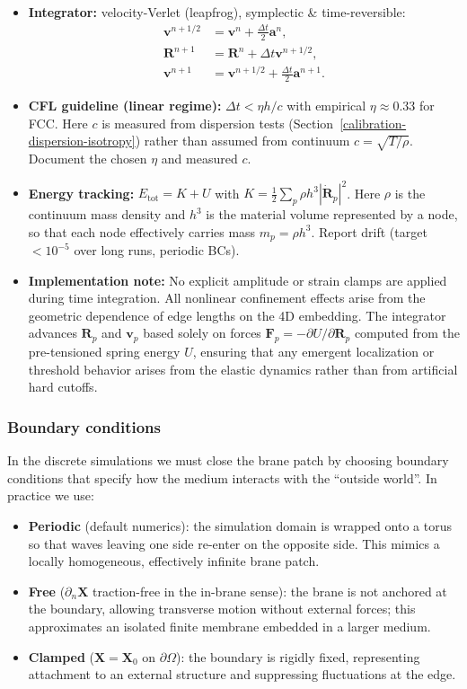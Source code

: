 \begin{itemize}
\item \textbf{Integrator:} velocity-Verlet (leapfrog), symplectic \& time-reversible:
  \begin{align*}
  \mathbf v^{n+1/2}&=\mathbf v^n+\tfrac{\Delta t}{2}\mathbf a^n,\\
  \mathbf R^{n+1}&=\mathbf R^n+\Delta t\mathbf v^{n+1/2},\\
  \mathbf v^{n+1}&=\mathbf v^{n+1/2}+\tfrac{\Delta t}{2}\mathbf a^{n+1}.
  \end{align*}
\item \textbf{CFL guideline (linear regime):} $\Delta t<\eta h/c$ with empirical $\eta\approx0.33$ for FCC. Here $c$ is measured from dispersion tests (Section~\ref{calibration-dispersion-isotropy}) rather than assumed from continuum $c=\sqrt{T/\rho}$. Document the chosen $\eta$ and measured $c$.
\item \textbf{Energy tracking:} $E_\text{tot}=K+U$ with $K=\tfrac12\sum_p \rho h^3|\dot{\mathbf R}_p|^2$.
  Here $\rho$ is the continuum mass density and $h^3$ is the material volume represented by a node,
  so that each node effectively carries mass $m_p=\rho h^3$.
  Report drift (target $<10^{-5}$ over long runs, periodic BCs).
\item \textbf{Implementation note:} No explicit amplitude or strain clamps are applied during time integration. All nonlinear confinement effects arise from the geometric dependence of edge lengths on the 4D embedding. The integrator advances $\mathbf R_p$ and $\mathbf v_p$ based solely on forces $\mathbf F_p = -\partial U/\partial \mathbf R_p$ computed from the pre-tensioned spring energy $U$, ensuring that any emergent localization or threshold behavior arises from the elastic dynamics rather than from artificial hard cutoffs.
\end{itemize}

\subsubsection{Boundary conditions}\label{boundary-conditions}

In the discrete simulations we must close the brane patch by choosing
boundary conditions that specify how the medium interacts with the
“outside world”. In practice we use:

\begin{itemize}
\item \textbf{Periodic} (default numerics): the simulation domain is
  wrapped onto a torus so that waves leaving one side re-enter on the
  opposite side. This mimics a locally homogeneous, effectively infinite
  brane patch.
\item \textbf{Free} ($\partial_n \mathbf X$ traction-free in the in-brane
  sense): the brane is not anchored at the boundary, allowing transverse
  motion without external forces; this approximates an isolated finite
  membrane embedded in a larger medium.
\item \textbf{Clamped} ($\mathbf X=\mathbf X_0$ on $\partial\Omega$):
  the boundary is rigidly fixed, representing attachment to an external
  structure and suppressing fluctuations at the edge.
\end{itemize}

